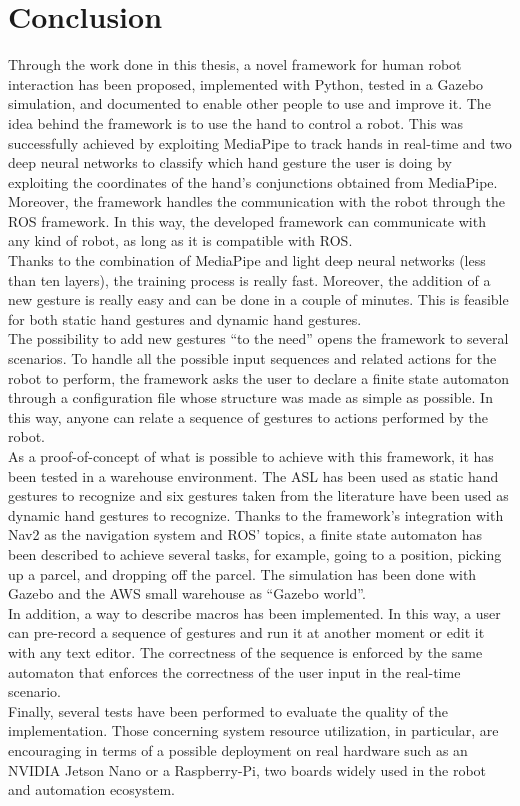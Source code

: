 \documentclass[../thesis.tex]{subfiles}
\begin{document}
\chapter{Conclusion}\label{cap:conclusion}
Through the work done in this thesis, a novel framework for human robot interaction has been proposed, implemented with Python, tested in a Gazebo simulation, and documented to enable other people to use and improve it. The idea behind the framework is to use the hand to control a robot. This was successfully achieved by exploiting MediaPipe to track hands in real-time and two deep neural networks to classify which hand gesture the user is doing by exploiting the coordinates of the hand's conjunctions obtained from MediaPipe. Moreover, the framework handles the communication with the robot through the \gls{ROS} framework. In this way, the developed framework can communicate with any kind of robot, as long as it is compatible with \gls{ROS}.\\

Thanks to the combination of MediaPipe and light deep neural networks (less than ten layers), the training process is really fast. Moreover, the addition of a new gesture is really easy and can be done in a couple of minutes. This is feasible for both static hand gestures and dynamic hand gestures.\\

The possibility to add new gestures ``to the need'' opens the framework to several scenarios. To handle all the possible input sequences and related actions for the robot to perform, the framework asks the user to declare a finite state automaton through a configuration file whose structure was made as simple as possible. In this way, anyone can relate a sequence of gestures to actions performed by the robot.\\

As a proof-of-concept of what is possible to achieve with this framework, it has been tested in a warehouse environment. The \gls{ASL} has been used as static hand gestures to recognize and six gestures taken from the literature have been used as dynamic hand gestures to recognize. Thanks to the framework's integration with Nav2 as the navigation system and \gls{ROS}' topics, a finite state automaton has been described to achieve several tasks, for example, going to a position, picking up a parcel, and dropping off the parcel. The simulation has been done with Gazebo and the AWS small warehouse as ``Gazebo world''.\\

In addition, a way to describe macros has been implemented. In this way, a user can pre-record a sequence of gestures and run it at another moment or edit it with any text editor. The correctness of the sequence is enforced by the same automaton that enforces the correctness of the user input in the real-time scenario.\\

Finally, several tests have been performed to evaluate the quality of the implementation. Those concerning system resource utilization, in particular, are encouraging in terms of a possible deployment on real hardware such as an NVIDIA Jetson Nano or a Raspberry-Pi, two boards widely used in the robot and automation ecosystem.
\end{document}
